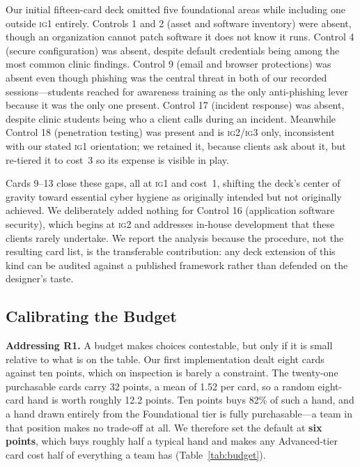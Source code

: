 \documentclass[10pt,twocolumn,letterpaper]{article}
\newcommand{\ig}[1]{\textsc{ig#1}}
\begin{document}
Our initial fifteen-card deck omitted five foundational areas while including
one outside \ig{1} entirely. Controls 1 and 2 (asset and software inventory)
were absent, though an organization cannot patch software it does not know it
runs. Control 4 (secure configuration) was absent, despite default credentials
being among the most common clinic findings. Control 9 (email and browser
protections) was absent even though phishing was the central threat in both of
our recorded sessions---students reached for awareness training as the only
anti-phishing lever because it was the only one present. Control 17 (incident
response) was absent, despite clinic students being who a client calls during an
incident. Meanwhile Control 18 (penetration testing) was present and is
\ig{2}/\ig{3} only, inconsistent with our stated \ig{1} orientation; we retained
it, because clients ask about it, but re-tiered it to cost~3 so its expense is
visible in play.

Cards 9--13 close these gaps, all at \ig{1} and cost~1, shifting the deck's
center of gravity toward essential cyber hygiene as originally intended but not
originally achieved. We deliberately added nothing for Control 16 (application
software security), which begins at \ig{2} and addresses in-house development
that these clients rarely undertake. We report the analysis because the
procedure, not the resulting card list, is the transferable contribution: any
deck extension of this kind can be audited against a published framework rather
than defended on the designer's taste.

\subsection{Calibrating the Budget}
\label{sec:budget}

\textbf{Addressing R1.} A budget makes choices contestable, but only if it is
small relative to what is on the table. Our first implementation dealt eight
cards against ten points, which on inspection
is barely a constraint. The twenty-one purchasable cards carry 32 points, a mean
of 1.52 per card, so a random eight-card hand is worth roughly 12.2 points. Ten
points buys 82\% of such a hand, and a hand drawn entirely from the Foundational
tier is fully purchasable---a team in that position makes no trade-off at all.
We therefore set the default at \textbf{six points}, which buys roughly half a
typical hand and makes any Advanced-tier card cost half of everything a team has
(Table~\ref{tab:budget}).
\end{document}
